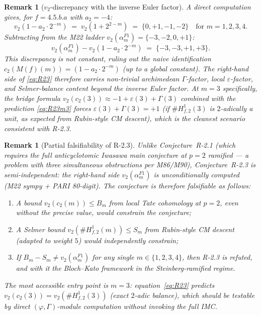 \documentclass[12pt]{amsart}
\newtheorem{remark}[conjecture]{Remark}
\theoremstyle{definition}
\begin{document}
\begin{remark}[$v_2$-discrepancy with the inverse Euler factor]
\label{rem:v2-discrepancy}
A direct computation gives, for $f = 4.5.b.a$ with $a_2 = -4$:
\begin{equation*}
  v_2\!\left(1 - a_2 \cdot 2^{-m}\right) \;=\; v_2\!\left(1 + 2^{2-m}\right)
  \;=\; \{0, +1, -1, -2\} \quad\text{for } m = 1, 2, 3, 4.
\end{equation*}
Subtracting from the M22 ladder $v_2(\alpha_m^{F1}) = \{-3, -2, 0, +1\}$:
\begin{equation*}
  v_2(\alpha_m^{F1}) - v_2(1 - a_2 \cdot 2^{-m}) \;=\; \{-3, -3, +1, +3\}.
\end{equation*}
This discrepancy is \emph{not constant}, ruling out the naive identification
$c_2(M(f)(m)) = (1 - a_2 \cdot 2^{-m})$ (up to a global constant).  The
right-hand side of \eqref{eq:R23} therefore carries non-trivial archimedean
$\Gamma$-factor, local $\varepsilon$-factor, and Selmer-balance content beyond
the inverse Euler factor.  At $m = 3$ specifically, the bridge formula
$v_2(c_2(3)) \approx -1 + \varepsilon(3) + \Gamma(3)$ combined with the
prediction \eqref{eq:R23m3} forces $\varepsilon(3) + \Gamma(3) = +1$
(if $\#H^1_{f,2}(3)$ is $2$-adically a unit, as expected from Rubin-style
CM descent), which is the cleanest scenario consistent with R-2.3.

\end{remark}

\begin{remark}[Partial falsifiability of R-2.3]
\label{rem:R23-falsifiable}
Unlike Conjecture~R-2.1 (which requires the full anticyclotomic Iwasawa
main conjecture at $p=2$ ramified --- a problem with three simultaneous
obstructions per M86/M90), Conjecture~R-2.3 is \emph{semi-independent}:
the right-hand side $v_2(\alpha_m^{F1})$ is unconditionally computed (M22 sympy +
PARI 80-digit). The conjecture is therefore \emph{falsifiable} as follows:
\begin{enumerate}[label=(\alph*)]
  \item A bound $v_2(c_2(m)) \leq B_m$ from local Tate cohomology at $p=2$,
    even without the precise value, would constrain the conjecture;
  \item A Selmer bound $v_2(\#H^1_{f,2}(m)) \leq S_m$ from Rubin-style CM
    descent \cite{Rub91} (adapted to weight $5$) would independently constrain;
  \item If $B_m - S_m \neq v_2(\alpha_m^{F1})$ for any single $m \in \{1,2,3,4\}$,
    then R-2.3 is refuted, and with it the Bloch--Kato framework
    in the Steinberg-ramified regime.
\end{enumerate}
The most accessible entry point is $m = 3$: equation~\eqref{eq:R23} predicts
$v_2(c_2(3)) = v_2(\#H^1_{f,2}(3))$ (\emph{exact $2$-adic balance}), which
should be testable by direct $(\varphi,\Gamma)$-module computation
without invoking the full IMC.
\end{remark}
\end{document}
